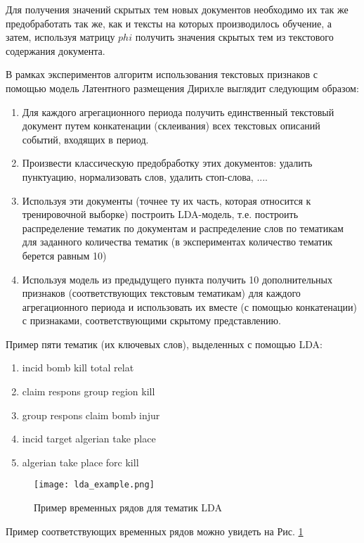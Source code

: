 Для получения значений скрытых тем новых документов необходимо их так же предобработать так же, как и тексты на которых производилось обучение, а затем, используя матрицу $phi$ получить значения скрытых тем из текстового содержания документа.

В рамках экспериментов алгоритм использования текстовых признаков с помощью модель Латентного размещения Дирихле выглядит следующим образом:
\begin{enumerate}
    \item Для каждого агрегационного периода получить единственный текстовый документ путем конкатенации (склеивания) всех текстовых описаний событий, входящих в период.
    \item Произвести классическую предобработку этих документов: удалить пунктуацию, нормализовать слов, удалить стоп-слова, ....
    \item Используя эти документы (точнее ту их часть, которая относится к тренировочной выборке) построить LDA-модель, т.е. построить распределение тематик по документам и распределение слов по тематикам для заданного количества тематик (в экспериментах количество тематик берется равным 10)
    \item Используя модель из предыдущего пункта получить 10 дополнительных признаков (соответствующих текстовым тематикам) для каждого агрегационного периода и использовать их вместе (с помощью конкатенации) с признаками, соответствующими скрытому представлению.
\end{enumerate}

Пример пяти тематик (их ключевых слов), выделенных с помощью LDA:
\begin{enumerate}
    \item incid bomb kill total relat
    \item claim respons group region kill
    \item group respons claim bomb injur
    \item incid target algerian take place
    \item algerian take place forc kill
\end{enumerate}

\begin{figure}
  \texttt{[image: lda\_example.png]}
  \caption{Пример временных рядов для тематик LDA}
  \label{fig:lda_example}
\end{figure}

Пример соответствующих временных рядов можно увидеть на Рис. \ref{fig:lda_example}

